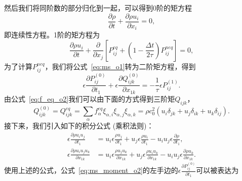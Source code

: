 然后我们将同阶数的部分归化到一起，可以得到0阶的矩方程
\begin{equation}
\frac{\partial \rho}{\partial t}+\frac{\partial \rho u_{i}}{\partial x_{i}}=0,
\end{equation}
即连续性方程。1阶的矩方程为
\begin{equation}
\frac{\partial \rho u_{i}}{\partial t}+\frac{\partial}{\partial x_{j}}\left[P_{i j}^{e q}+\left(1-\frac{\Delta t}{2 \tau}\right) P_{i j}^{n e q}\right]=0,
\end{equation}
为了计算$P_{i j}^{n e q}$，我们将公式~\ref{eq:ms_o1}转为二阶矩方程，得到
\begin{equation}
\epsilon \frac{\partial P_{i j}^{(0)}}{\partial t_{1}}+\epsilon \frac{\partial Q_{i j k}^{(0)}}{\partial x_{1 k}}=-\frac{1}{\tau} \epsilon P_{i j}^{(1)}.
\label{eq:ms_moment_o2}
\end{equation}
由公式~\ref{eq:f_eq_o2}我们可以由下面的方式得到三阶矩$Q_{ijk}$，
\begin{equation}
Q_{i j k}^{(0)}=Q_{i j k}^{e q}=\sum_{\alpha} f_{\alpha}^{e q} \xi_{\alpha, i} \xi_{\alpha, j} \xi_{\alpha, k}=\rho c_{0}^{2}\left(u_{i} \delta_{j k}+u_{j} \delta_{i k}+u_{k} \delta_{i j}\right).
\end{equation}
接下来，我们引入如下的积分公式 (乘积法则)：
\begin{align}
\epsilon \frac{\partial \rho u_{i} u_{j}}{\partial t_{1}} & =u_{i} \epsilon \frac{\rho u_{j}}{\partial t_{1}}+u_{j} \epsilon \frac{\rho u_{i}}{\partial t_{1}}-u_{i} u_{j} \epsilon \frac{\partial \rho}{\partial t_{1}}, \\
\epsilon \frac{\partial \rho u_{i} u_{j} u_{k}}{\partial x_{1 k}} & =u_{i} \epsilon \frac{\rho u_{j} u_{k}}{\partial x_{1 k}}+u_{j} \epsilon \frac{\rho u_{i} u_{k}}{\partial x_{1 k}}-u_{i} u_{j} \epsilon \frac{\partial \rho u_{k}}{\partial x_{1 k}} .
\end{align}
使用上述的公式，公式~\ref{eq:ms_moment_o2}的左手边的$\epsilon \frac{\partial P_{i j}^{(0)}}{\partial t_{1}}$可以被表达为
